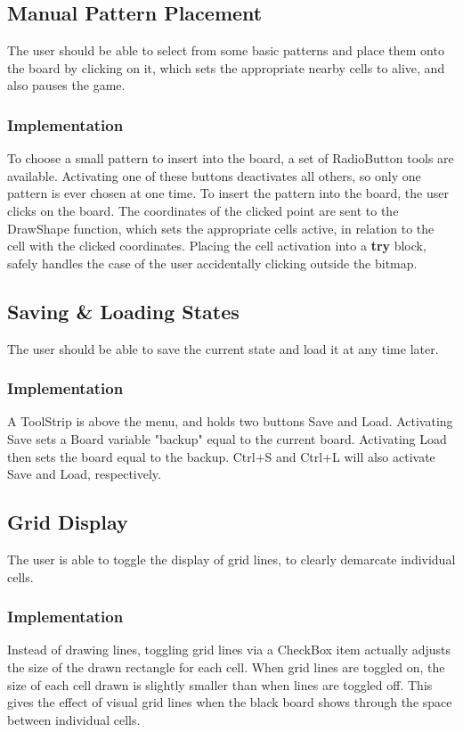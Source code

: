 \documentclass[12pt, letterpaper]{article}
\begin{document}
\subsection*{Manual Pattern Placement}
The user should be able to select from some basic patterns and place them onto the board by clicking on it, which sets the appropriate nearby cells to alive, and also pauses the game.
\subsubsection*{Implementation}
To choose a small pattern to insert into the board, a set of RadioButton tools are available. Activating one of these buttons deactivates all others, so only one pattern is ever chosen at one time. To insert the pattern into the board, the user clicks on the board. The coordinates of the clicked point are sent to the DrawShape function, which sets the appropriate cells active, in relation to the cell with the clicked coordinates. Placing the cell activation into a \textbf{try} block, safely handles the case of the user accidentally clicking outside the bitmap. 

\subsection*{Saving \& Loading States}
The user should be able to save the current state and load it at any time later.
\subsubsection*{Implementation}
A ToolStrip is above the menu, and holds two buttons Save and Load. Activating Save sets a Board variable "backup" equal to the current board. Activating Load then sets the board equal to the backup. Ctrl+S and Ctrl+L will also activate Save and Load, respectively.

\subsection*{Grid Display}
The user is able to toggle the display of grid lines, to clearly demarcate individual cells.
\subsubsection*{Implementation}
Instead of drawing lines, toggling grid lines via a CheckBox item actually adjusts the size of the drawn rectangle for each cell. When grid lines are toggled on, the size of each cell drawn is slightly smaller than when lines are toggled off. This gives the effect of visual grid lines when the black board shows through the space between individual cells.
\end{document}
